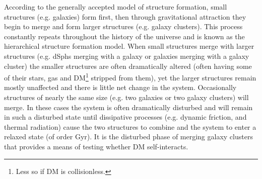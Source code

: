 According to the generally accepted model of structure formation, small structures (e.g. galaxies) form first, then through gravitational attraction they begin to merge and form larger structures (e.g. galaxy clusters).
This process constantly repeats throughout the history of the universe and is known as the hierarchical structure formation model.
When small structures merge with larger structures (e.g. dSphs merging with a galaxy or galaxies merging with a galaxy cluster) the smaller structures are often dramatically altered (often having some of their stars, gas and DM\footnote{Less so if DM is collisionless.} stripped from them), yet the larger structures remain mostly unaffected and there is little net change in the system.
Occasionally structures of nearly the same size (e.g. two galaxies or two galaxy clusters) will merge.
In these cases the system is often dramatically disturbed and will remain in such a disturbed state until dissipative processes (e.g. dynamic friction, and thermal radiation) cause the two structures to combine and the system to enter a relaxed state (of order Gyr).
It is the disturbed phase of merging galaxy clusters that provides a means of testing whether DM self-interacts.

